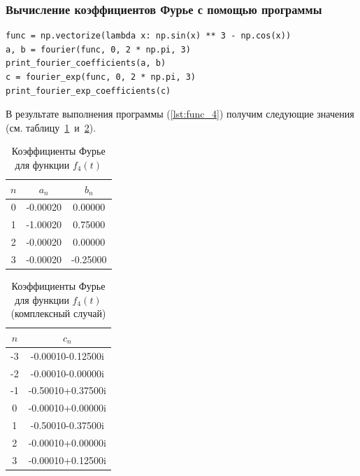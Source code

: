 \subsubsection{Вычисление коэффициентов Фурье с помощью программы}

\begin{lstlisting}[style=python_white, caption=Вычисление коэффициентов Фурье, label=lst:func_4]
func = np.vectorize(lambda x: np.sin(x) ** 3 - np.cos(x))
a, b = fourier(func, 0, 2 * np.pi, 3)
print_fourier_coefficients(a, b)
c = fourier_exp(func, 0, 2 * np.pi, 3)
print_fourier_exp_coefficients(c)
\end{lstlisting}

В результате выполнения программы (\ref{lst:func_4}) получим следующие значения (см. таблицу~\ref{tab:func_4}~и~\ref{tab:func_4_exp}).

\begin{table}[ht!]
    \centering
    \begin{tabular}{|c|c|c|}
        \hline
        $n$ & $a_n$ & $b_n$ \\
        \hline
        0 & -0.00020 & 0.00000\\
        1 & -1.00020 & 0.75000\\
        2 & -0.00020 & 0.00000\\
        3 & -0.00020 & -0.25000\\
        \hline
    \end{tabular}
    \caption{Коэффициенты Фурье для функции $f_4(t)$}
    \label{tab:func_4}
\end{table}

\begin{table}[ht!]
    \centering
    \begin{tabular}{|c|c|}
        \hline
        $n$ & $c_n$ \\
        \hline
        -3 & -0.00010-0.12500i \\
        -2 & -0.00010-0.00000i \\
        -1 & -0.50010+0.37500i \\
        0 & -0.00010+0.00000i \\
        1 & -0.50010-0.37500i \\
        2 & -0.00010+0.00000i \\
        3 & -0.00010+0.12500i \\
        \hline
    \end{tabular}
    \caption{Коэффициенты Фурье для функции $f_4(t)$ (комплексный случай)}
    \label{tab:func_4_exp}
\end{table}

